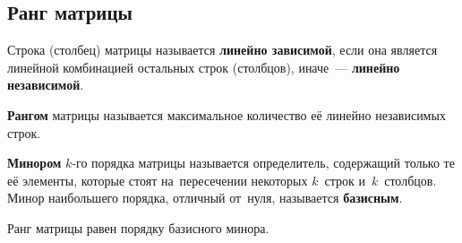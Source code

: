 \subsection{Ранг матрицы}
Строка (столбец) матрицы  называется \textbf{линейно зависимой}, если она является линейной комбинацией остальных строк (столбцов), иначе~--- \textbf{линейно независимой}.

\textbf{Рангом} матрицы называется максимальное количество её линейно независимых строк.

\textbf{Минором} $k$\nobreakdash-го порядка матрицы называется определитель, содержащий только те её элементы, которые стоят на~пересечении некоторых $k$~строк и~$k$~столбцов.
Минор наибольшего порядка, отличный от~нуля, называется \textbf{базисным}.

\begin{theorem}
Ранг матрицы равен порядку базисного минора.
\end{theorem}
